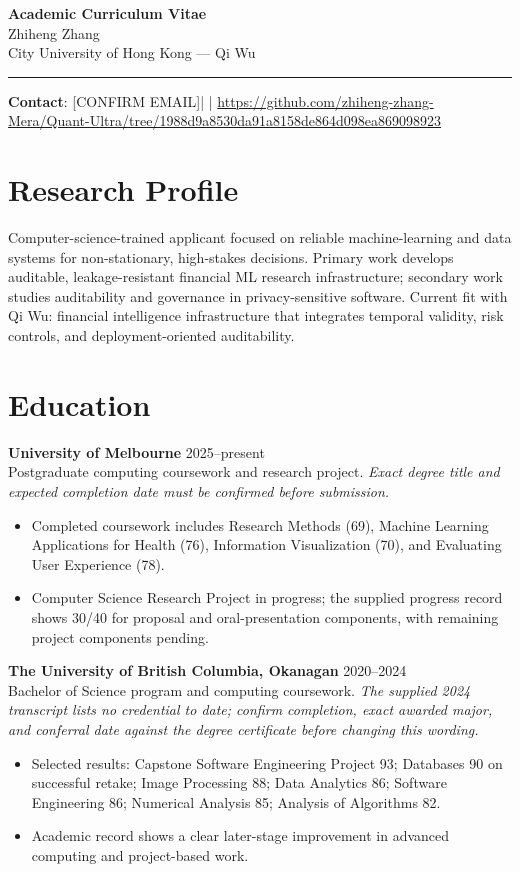 \documentclass[11pt]{article}
\newcommand{\ApplicantName}{Zhiheng Zhang}
\newcommand{\ApplicantEmail}{[CONFIRM EMAIL]}
\newcommand{\ApplicantPhone}{[CONFIRM PHONE]}
\newcommand{\ApplicantGitHub}{\url{https://github.com/zhiheng-zhang-Mera/Quant-Ultra/tree/1988d9a8530da91a8158de864d098ea869098923}}
\begin{document}
\begin{center}
{\LARGE\bfseries Academic Curriculum Vitae}\\[0.25em]
{\large \ApplicantName}\\
City University of Hong Kong --- Qi Wu
\end{center}
\vspace{0.35em}\hrule\vspace{0.65em}

\textbf{Contact}: \ApplicantEmail\quad | \quad \ApplicantPhone\quad | \quad \ApplicantGitHub

\section*{Research Profile}
Computer-science-trained applicant focused on reliable machine-learning and data systems for non-stationary, high-stakes decisions. Primary work develops auditable, leakage-resistant financial ML research infrastructure; secondary work studies auditability and governance in privacy-sensitive software. Current fit with Qi Wu: financial intelligence infrastructure that integrates temporal validity, risk controls, and deployment-oriented auditability.

\section*{Education}
\textbf{University of Melbourne} \hfill 2025--present\\
Postgraduate computing coursework and research project. \textit{Exact degree title and expected completion date must be confirmed before submission.}
\begin{itemize}
\item Completed coursework includes Research Methods (69), Machine Learning Applications for Health (76), Information Visualization (70), and Evaluating User Experience (78).
\item Computer Science Research Project in progress; the supplied progress record shows 30/40 for proposal and oral-presentation components, with remaining project components pending.
\end{itemize}

\textbf{The University of British Columbia, Okanagan} \hfill 2020--2024\\
Bachelor of Science program and computing coursework. \textit{The supplied 2024 transcript lists no credential to date; confirm completion, exact awarded major, and conferral date against the degree certificate before changing this wording.}
\begin{itemize}
\item Selected results: Capstone Software Engineering Project 93; Databases 90 on successful retake; Image Processing 88; Data Analytics 86; Software Engineering 86; Numerical Analysis 85; Analysis of Algorithms 82.
\item Academic record shows a clear later-stage improvement in advanced computing and project-based work.
\end{itemize}
\end{document}
